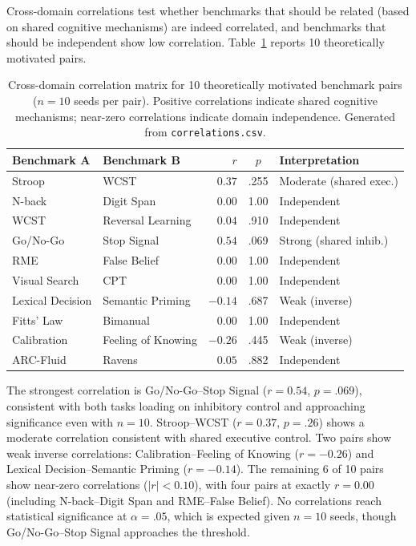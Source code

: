 \documentclass[11pt,letterpaper]{article}
\begin{document}
Cross-domain correlations test whether benchmarks that should be related (based on shared cognitive mechanisms) are indeed correlated, and benchmarks that should be independent show low correlation. Table~\ref{tab:correlations} reports 10 theoretically motivated pairs.

\begin{table}[t]
\centering
\caption{Cross-domain correlation matrix for 10 theoretically motivated benchmark pairs ($n = 10$ seeds per pair). Positive correlations indicate shared cognitive mechanisms; near-zero correlations indicate domain independence. Generated from \texttt{correlations.csv}.}
\label{tab:correlations}
\small
\begin{tabular}{@{}llrcl@{}}
\toprule
\textbf{Benchmark A} & \textbf{Benchmark B} & \textbf{$r$} & \textbf{$p$} & \textbf{Interpretation} \\
\midrule
Stroop             & WCST               &  $0.37$ & .255 & Moderate (shared exec.) \\
N-back             & Digit Span         &  $0.00$ & 1.00 & Independent \\
WCST               & Reversal Learning  &  $0.04$ & .910 & Independent \\
Go/No-Go           & Stop Signal        &  $0.54$ & .069 & Strong (shared inhib.) \\
RME                & False Belief       &  $0.00$ & 1.00 & Independent \\
Visual Search      & CPT                &  $0.00$ & 1.00 & Independent \\
Lexical Decision   & Semantic Priming   & $-0.14$ & .687 & Weak (inverse) \\
Fitts' Law         & Bimanual           &  $0.00$ & 1.00 & Independent \\
Calibration        & Feeling of Knowing & $-0.26$ & .445 & Weak (inverse) \\
ARC-Fluid          & Ravens             &  $0.05$ & .882 & Independent \\
\bottomrule
\end{tabular}
\end{table}

The strongest correlation is Go/No-Go--Stop Signal ($r = 0.54$, $p = .069$), consistent with both tasks loading on inhibitory control and approaching significance even with $n = 10$. Stroop--WCST ($r = 0.37$, $p = .26$) shows a moderate correlation consistent with shared executive control. Two pairs show weak inverse correlations: Calibration--Feeling of Knowing ($r = -0.26$) and Lexical Decision--Semantic Priming ($r = -0.14$). The remaining 6 of 10 pairs show near-zero correlations ($|r| < 0.10$), with four pairs at exactly $r = 0.00$ (including N-back--Digit Span and RME--False Belief). No correlations reach statistical significance at $\alpha = .05$, which is expected given $n = 10$ seeds, though Go/No-Go--Stop Signal approaches the threshold.
\end{document}
